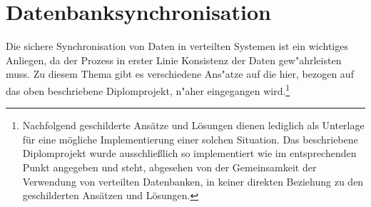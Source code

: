 \documentclass[a4paper,14pt]{scrreprt}
\begin{document}
\section{Datenbanksynchronisation}
Die sichere Synchronisation von Daten in verteilten Systemen ist ein wichtiges Anliegen, da der Prozess in erster Linie Konsistenz der Daten gew"ahrleisten muss. Zu diesem Thema gibt es verschiedene Ans"atze auf die hier, bezogen auf das oben beschriebene Diplomprojekt, n"aher eingegangen wird.\footnote{Nachfolgend geschilderte Ansätze und Lösungen dienen lediglich als Unterlage für eine mögliche Implementierung einer solchen Situation. Das beschriebene Diplomprojekt wurde ausschließlich so implementiert wie im entsprechenden Punkt angegeben und steht, abgesehen von der Gemeinsamkeit der Verwendung von verteilten Datenbanken, in keiner direkten Beziehung zu den geschilderten Ansätzen und Lösungen.}
\end{document}
